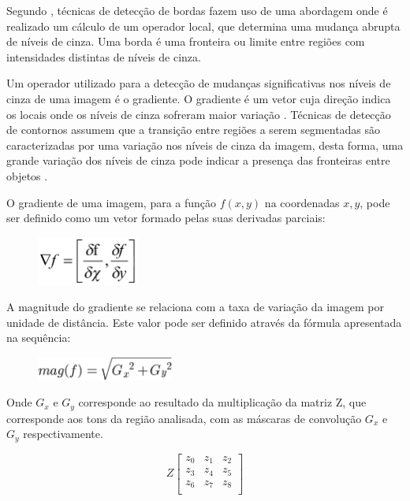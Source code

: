 \documentclass[
	12pt,				%
	oneside,			%
	a4paper,			%
	english,			%
	french,				%
	spanish,			%
	brazil,				%
	]{abntex2}
\begin{document}
Segundo \citet{pedriniSchwartz:2008}, técnicas de detecção de bordas fazem uso de uma abordagem onde é realizado um cálculo de um operador local, que determina uma mudança abrupta de níveis de cinza. Uma borda é uma fronteira ou limite entre regiões com intensidades distintas de níveis de cinza.

Um operador utilizado para a detecção de mudanças significativas nos níveis de cinza de uma imagem é o gradiente. O gradiente é um vetor cuja direção indica os locais onde os níveis de cinza sofreram maior variação \cite{pedriniSchwartz:2008}. Técnicas de detecção de contornos assumem que a transição entre regiões a serem segmentadas são caracterizadas por uma variação nos níveis de cinza da imagem, desta forma, uma grande variação dos níveis de cinza pode indicar a presença das fronteiras entre objetos \cite{conciAzevedoLeta:2008}. 

O gradiente de uma imagem, para a função \(f(x,y)\) na coordenadas \(x,y\), pode ser definido como um vetor formado pelas suas derivadas parciais:

\begin{figure}[ht]
\centering
\includegraphics[width=0.3\textwidth]{imagens/gradiente.png}

\end{figure}

A magnitude do gradiente se relaciona com a taxa de variação da imagem por unidade de distância. Este valor pode ser definido através da fórmula apresentada na sequência:

\begin{figure}[ht]
\centering
\includegraphics[width=0.4\textwidth]{imagens/magnitude.png}
\end{figure}

Onde \(G_x\) e \(G_y\) corresponde ao resultado da multiplicação da matriz Z, que corresponde aos tons da região analisada, com as máscaras de convolução \(G_x\) e \(G_y\) respectivamente.

\[
Z
\begin{bmatrix}
    z_0 & z_1 & z_2    \\
	z_3 & z_4 & z_5    \\  
	z_6 & z_7 & z_8    \\  
\end{bmatrix} 
\]
\end{document}
